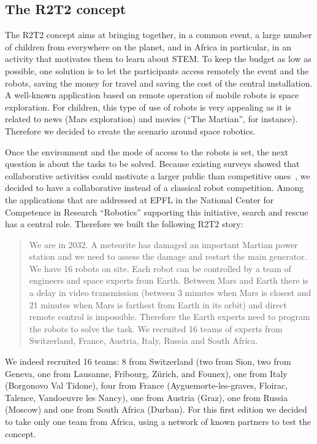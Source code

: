 \documentclass{intech-journal}
\begin{document}
\subsection{The R2T2 concept}

The R2T2 concept aims at bringing together, in a common event, a large number of children from everywhere on the planet, and in Africa in particular, in an activity that motivates them to learn about STEM.
To keep the budget as low as possible, one solution is to let the participants access remotely the event and the robots, saving the money for travel and saving the cost of the central installation.
A well-known application based on remote operation of mobile robots is space exploration.
For children, this type of use of robots is very appealing as it is related to news (Mars exploration) and movies (``The Martian'', for instance).
Therefore we decided to create the scenario around space robotics.

Once the environment and the mode of access to the robots is set, the next question is about the tasks to be solved.
Because existing surveys showed that collaborative activities could motivate a larger public than competitive ones~\cite{riedo2013upgrade}, we decided to have a collaborative instead of a classical robot competition. 
Among the applications that are addressed at EPFL in the National Center for Competence in Research ``Robotics'' supporting this initiative, search and rescue has a central role.
Therefore we built the following R2T2 story:
\begin{quotation}
We are in 2032. A meteorite has damaged an important Martian power station and we need to assess the damage and restart the main generator. We have 16 robots on site. Each robot can be controlled by a team of engineers and space experts from Earth. Between Mars and Earth there is a delay in video transmission (between 3 minutes when Mars is closest and 21 minutes when Mars is farthest from Earth in its orbit) and direct remote control is impossible. Therefore the Earth experts need to program the robots to solve the task. We recruited 16 teams of experts from Switzerland, France, Austria, Italy, Russia and South Africa.
\end{quotation}
We indeed recruited 16 teams: 8 from Switzerland (two from Sion, two from Geneva, one from Lausanne, Fribourg, Zürich, and Founex), one from Italy (Borgonovo Val Tidone), four from France (Ayguemorte-les-graves, Floirac, Talence, Vandoeuvre les Nancy), one from Austria (Graz), one from Russia (Moscow) and one from South Africa (Durban). 
For this first edition we decided to take only one team from Africa, using a network of known partners to test the concept.
\end{document}
